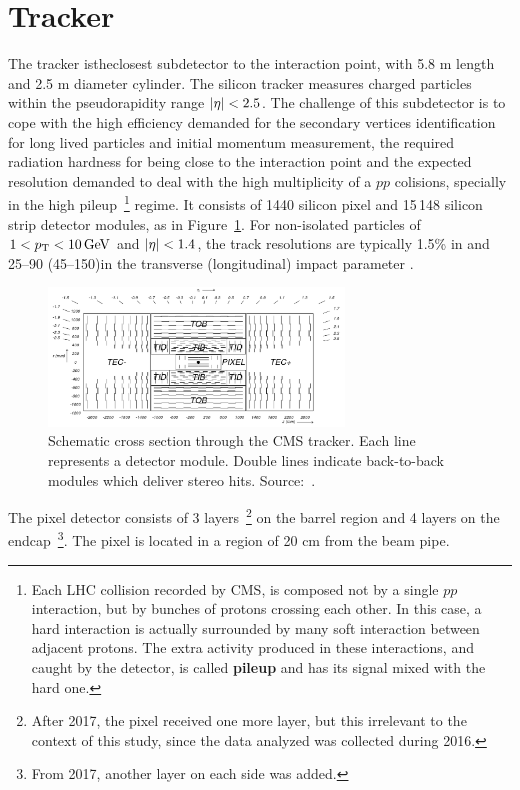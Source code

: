
\section{Tracker}

The tracker istheclosest subdetector to the interaction point, with 5.8 m length and 2.5 m diameter cylinder. The silicon tracker measures charged particles within the pseudorapidity range $\lvert \eta \rvert < 2.5$. The challenge of this subdetector is to cope with the high efficiency demanded for the secondary vertices identification for long lived particles and initial momentum measurement, the required radiation hardness for being close to the interaction point and the expected resolution demanded to deal with the high multiplicity of a $pp$ colisions, specially in the high pileup~\footnote{Each LHC collision recorded by CMS, is composed not by a single $pp$ interaction, but by bunches of protons crossing each other. In this case, a hard interaction is actually surrounded by many soft interaction between adjacent protons. The extra activity produced in these interactions, and caught by the detector, is called \textbf{pileup} and has its signal mixed with the hard one.} regime. It consists of 1440 silicon pixel and 15\,148 silicon strip detector modules, as in Figure~\ref{cms_tracker}. For non-isolated particles of $1 < p_{\mathrm{T}} < 10\,\text{Ge\hspace{-.08em}V}$ and $\lvert \eta \rvert < 1.4$, the track resolutions are typically 1.5\% in \pt and 25--90 (45--150)\mum in the transverse (longitudinal) impact parameter \cite{TRK-11-001}.

\begin{figure}[htbp]
    \centering
    \includegraphics[width=0.7\textwidth]{figures_and_tables/experimental_setup/tracker.png}
    \caption{ Schematic cross section through the CMS tracker. Each line represents a detector
    module. Double lines indicate back-to-back modules which deliver stereo hits. Source:~\cite{Chatrchyan:2008zzk}.}
    \label{cms_tracker}
\end{figure}

The pixel detector consists of 3 layers~\footnote{After 2017, the pixel received one more layer, but this irrelevant to the context of this study, since the data analyzed was collected during 2016.} on the barrel region and 4 layers on the endcap~\footnote{From 2017, another layer on each side was added.}. The pixel is located in a region of 20 cm from the beam pipe.

